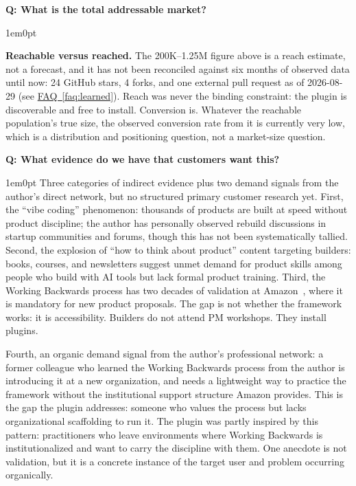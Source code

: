 \documentclass[11pt,letterpaper]{article}
\newcounter{faqnum}
\newenvironment{faqpair}[1]{%
  \needspace{4\baselineskip}%
  \vspace{0.5em}%
  \refstepcounter{faqnum}%
  \noindent\textbf{\color{SectionBlue}Q\thefaqnum: #1}\par\nopagebreak[4]%
  \vspace{0.2em}%
  \begin{adjustwidth}{1em}{0pt}%
  \setlength{\parindent}{0pt}%
}{%
  \end{adjustwidth}%
  \vspace{0.5em}%
}
\newcommand{\faqref}[1]{\hyperref[#1]{FAQ~\ref*{#1}}}
\begin{document}
\begin{faqpair}{What is the total addressable market?}
  \textbf{Reachable versus reached.} The 200K--1.25M figure above is a reach estimate, not a forecast, and it has not been reconciled against six months of observed data until now: 24 GitHub stars, 4 forks, and one external pull request as of 2026-08-29 (see \faqref{faq:learned}). Reach was never the binding constraint: the plugin is discoverable and free to install. Conversion is. Whatever the reachable population's true size, the observed conversion rate from it is currently very low, which is a distribution and positioning question, not a market-size question.
\end{faqpair}

\begin{faqpair}{What evidence do we have that customers want this?}\label{faq:customer-evidence}
  Three categories of indirect evidence plus two demand signals from the author's direct network, but no structured primary customer research yet. First, the ``vibe coding'' phenomenon: thousands of products are built at speed without product discipline; the author has personally observed rebuild discussions in startup communities and forums, though this has not been systematically tallied. Second, the explosion of ``how to think about product'' content targeting builders: books, courses, and newsletters suggest unmet demand for product skills among people who build with AI tools but lack formal product training. Third, the Working Backwards process has two decades of validation at Amazon~\cite{bryar2021workingbackwards}, where it is mandatory for new product proposals. The gap is not whether the framework works: it is accessibility. Builders do not attend PM workshops. They install plugins.

  Fourth, an organic demand signal from the author's professional network: a former colleague who learned the Working Backwards process from the author is introducing it at a new organization, and needs a lightweight way to practice the framework without the institutional support structure Amazon provides. This is the gap the plugin addresses: someone who values the process but lacks organizational scaffolding to run it. The plugin was partly inspired by this pattern: practitioners who leave environments where Working Backwards is institutionalized and want to carry the discipline with them. One anecdote is not validation, but it is a concrete instance of the target user and problem occurring organically.


\end{faqpair}
\end{document}
